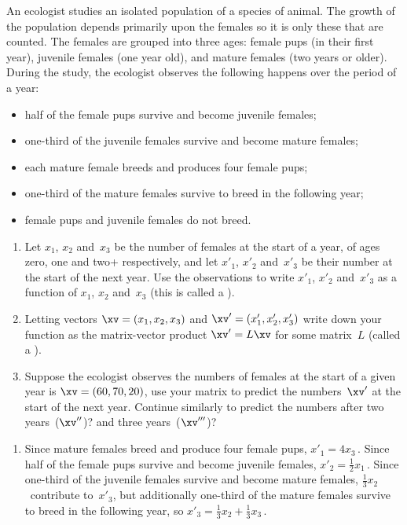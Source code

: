 \begin{example} \label{eg:matasp}
An ecologist studies an isolated population of a species of animal.
The growth of the population depends primarily upon the females so it is only these that are counted.
The females are grouped into three ages: female pups (in their first year), juvenile females (one year old), and mature females (two years or older).
During the study, the ecologist observes the following happens over the period of a year:
\begin{itemize}
\item  half of the female pups survive and become juvenile females;
\item  one-third of the juvenile females survive and become mature females;
\item  each mature female breeds and produces four female pups;
\item  one-third of the mature females survive to breed in the following year;
\item  female pups and juvenile females do not breed.
\end{itemize}
\begin{enumerate}
\item Let \(x_1\), \(x_2\) and~\(x_3\) be the number of females at the start of a year, of ages zero, one and two+ respectively, and let \(x'_1\), \(x'_2\) and~\(x'_3\) be their number at the start of the next year.
Use the observations to write \(x'_1\), \(x'_2\) and~\(x'_3\) as a function of \(x_1\), \(x_2\) and~\(x_3\)  (this is called a ).
\item Letting vectors \(\xv=(x_1,x_2,x_3)\) and \(\xv'=(x'_1,x'_2,x'_3)\) write down your function as the matrix-vector product \(\xv'=L\xv\) for some matrix~\(L\) (called a ).
\item Suppose the ecologist observes the numbers of females at the start of a given year is \(\xv=(60,70,20)\), use your matrix to predict the numbers~\(\xv'\) at the start of the next year.  
Continue similarly to predict the numbers after two years~(\(\xv''\))? and three years~(\(\xv'''\))?
\end{enumerate}

\begin{solution} 
\begin{enumerate}
\item Since mature females breed and produce four female pups, \(x'_1=4x_3\)\,.
Since half of the female pups survive and become juvenile females, \(x'_2=\frac12x_1\)\,.
Since one-third of the juvenile females survive and become mature females, \(\frac13x_2\)~contribute to~\(x'_3\), but additionally one-third of the mature females survive to breed in the following year, so  \(x'_3=\frac13x_2+\frac13x_3\)\,.


\end{enumerate}
\end{solution}
\end{example}
